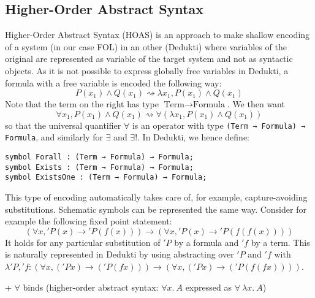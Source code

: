 \documentclass{article}
\newcommand{\Term}{\text{Term}}
\newcommand{\Formula}{\text{Formula}}
\begin{document}
	\subsection{Higher-Order Abstract Syntax}\label{SSect:HOAS}
	Higher-Order Abstract Syntax (HOAS) is an approach to make shallow encoding of a system (in our case FOL) in an other (Dedukti) where variables of the original are represented as variable of the target system and not as syntactic objects. As it is not possible to express globally free variables in Dedukti, a formula with a free variable is encoded the following way:
	$$
	P(x_1) \land Q(x_1) \rightsquigarrow \lambda x_1 ,  P(x_1) \land Q(x_1)
	$$
	Note that the term on the right has type $\Term \rightarrow \Formula$. We then want
	$$
	\forall x_1, P(x_1) \land Q(x_1) \rightsquigarrow \forall (\lambda x_1 ,  P(x_1) \land Q(x_1))
	$$
	so that the universal quantifier $\forall$ is an operator with type \lstinline[language=Dialekto, firstnumber=last]|(Term → Formula) → Formula|, and similarly for $\exists$ and $\exists !$. In Dedukti, we hence define:
	\begin{lstlisting}[language=Dialekto, firstnumber=last]
symbol Forall : (Term → Formula) → Formula;
symbol Exists : (Term → Formula) → Formula;
symbol ExistsOne : (Term → Formula) → Formula;
\end{lstlisting}
This type of encoding automatically takes care of, for example, capture-avoiding substitutions. Schematic symbols can be represented the same way. Consider for example the following fixed point statement:
$$
	(\forall x, 'P(x) \rightarrow 'P(f(x))) \rightarrow (\forall x, 'P(x) \rightarrow 'P(f(f(x))))
$$
It holds for any particular substitution of $'P$ by a formula and $'f$ by a term. This is naturally represented in Dedukti by using abstracting over $'P$ and $'f$ with $\lambda 'P, 'f: (\forall x, ('P x) \rightarrow ('P(f x))) \rightarrow (\forall x, ('P x) \rightarrow ('P (f (f x))))$.
	
	+ $\forall$ binds (higher-order abstract syntax: $\forall x.~A$ expressed as $\forall~\lambda x.~A$)
	
\end{document}
